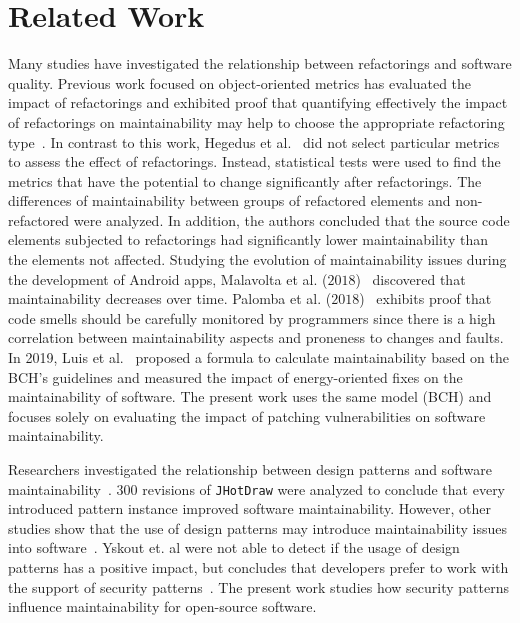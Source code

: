 \documentclass[10pt,conference]{IEEEtran}
\begin{document}
\section{Related Work}\label{sec:rw}

Many studies have investigated the relationship between refactorings and
software quality. Previous work focused on object-oriented metrics has evaluated the
impact of refactorings and exhibited proof that quantifying effectively the
impact of refactorings on maintainability may help to choose the appropriate
refactoring type~\cite{1167822}. In contrast to this work, Hegedus et
al.~\cite{HEGEDUS2018313} did not select particular metrics to assess the effect
of refactorings. Instead, statistical tests were used to find the metrics that
have the potential to change significantly after refactorings. The differences
of maintainability between groups of refactored elements and non-refactored were
analyzed. In addition, the authors concluded that the source code elements
subjected to refactorings had significantly lower maintainability than the
elements not affected. Studying the evolution of maintainability issues during
the development of Android apps, Malavolta et al. ($2018$)~\cite{8530041}
discovered that maintainability decreases over time. Palomba et al.
($2018$)~\cite{Palomba:2018:DIM:3231288.3231337} exhibits proof that code smells
should be carefully monitored by programmers since there is a high correlation
between maintainability aspects and proneness to changes and faults. In 2019, Luis et 
al.~\cite{cruz2019energyoriented} proposed a formula to calculate maintainability 
based on the BCH's guidelines and measured the impact of energy-oriented fixes 
on the maintainability of software.
The present work uses the same model (BCH) and focuses solely on evaluating 
the impact of patching vulnerabilities on software maintainability.

Researchers investigated the relationship between design patterns and software
maintainability~\cite{10.1007/978-3-642-35267-6-18}. $300$ revisions of
\texttt{JHotDraw} were analyzed to conclude that every introduced pattern
instance improved software maintainability. However, other studies show that the
use of design patterns may introduce maintainability issues into
software~\cite{4493325}. Yskout et. al were not able to detect if the usage of 
design patterns has a positive impact, but concludes that developers prefer to 
work with the support of security patterns~\cite{8077802}. The present work 
studies how security patterns influence maintainability for open-source software.
\end{document}
